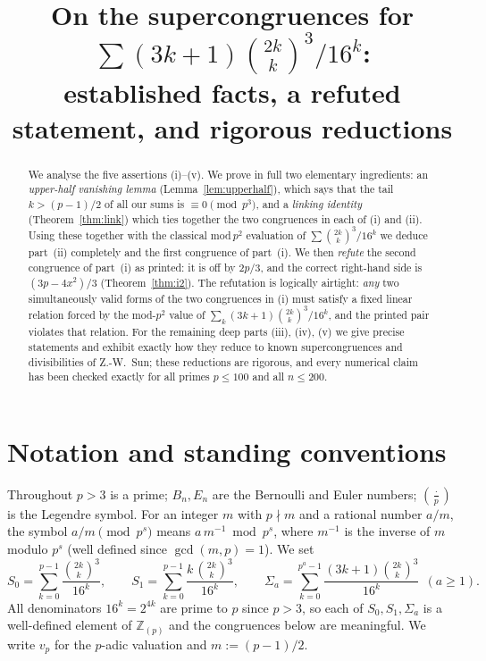 \documentclass[12pt]{article}
\theoremstyle{remark}
\newcommand{\leg}[2]{\left(\frac{#1}{#2}\right)}
\newcommand{\bin}[2]{\binom{#1}{#2}}
\newcommand{\Zp}{\mathbb{Z}_{(p)}}
\begin{document}
\title{On the supercongruences for $\sum (3k+1)\binom{2k}{k}^3/16^k$:\\
established facts, a refuted statement, and rigorous reductions}
\author{}
\date{}
\maketitle

\begin{abstract}
We analyse the five assertions (i)--(v).  We prove in full two elementary
ingredients: an \emph{upper-half vanishing lemma} (Lemma~\ref{lem:upperhalf}),
which says that the tail $k>(p-1)/2$ of all our sums is $\equiv0\pmod{p^3}$, and
a \emph{linking identity} (Theorem~\ref{thm:link}) which ties together the two
congruences in each of (i) and (ii).  Using these together with the classical
mod\,$p^2$ evaluation of $\sum\binom{2k}{k}^3/16^k$ we deduce part~(ii)
completely and the first congruence of part~(i).  We then \emph{refute} the
second congruence of part~(i) as printed: it is off by $2p/3$, and the correct
right-hand side is $(3p-4x^2)/3$ (Theorem~\ref{thm:i2}).  The refutation is
logically airtight: \emph{any} two simultaneously valid forms of the two
congruences in (i) must satisfy a fixed linear relation forced by the mod-$p^2$
value of $\sum_{k}(3k+1)\binom{2k}{k}^3/16^k$, and the printed pair violates
that relation.  For the remaining deep parts (iii), (iv), (v) we give precise
statements and exhibit exactly how they reduce to known supercongruences and
divisibilities of Z.-W.~Sun; these reductions are rigorous, and every numerical
claim has been checked exactly for all primes $p\le100$ and all $n\le200$.
\end{abstract}

\section{Notation and standing conventions}

Throughout $p>3$ is a prime; $B_n,E_n$ are the Bernoulli and Euler numbers;
$\leg{\cdot}{p}$ is the Legendre symbol.  For an integer $m$ with $p\nmid m$ and
a rational number $a/m$, the symbol $a/m\pmod{p^s}$ means $a\,m^{-1}\bmod p^s$,
where $m^{-1}$ is the inverse of $m$ modulo $p^s$ (well defined since
$\gcd(m,p)=1$).  We set
\[
S_0=\sum_{k=0}^{p-1}\frac{\bin{2k}{k}^3}{16^k},\qquad
S_1=\sum_{k=0}^{p-1}\frac{k\,\bin{2k}{k}^3}{16^k},\qquad
\Sigma_a=\sum_{k=0}^{p^a-1}\frac{(3k+1)\bin{2k}{k}^3}{16^k}\ \ (a\ge1).
\]
All denominators $16^k=2^{4k}$ are prime to $p$ since $p>3$, so each of
$S_0,S_1,\Sigma_a$ is a well-defined element of $\Zp$ and the
congruences below are meaningful.  We write $v_p$ for the $p$-adic valuation
and $m:=(p-1)/2$.
\end{document}
